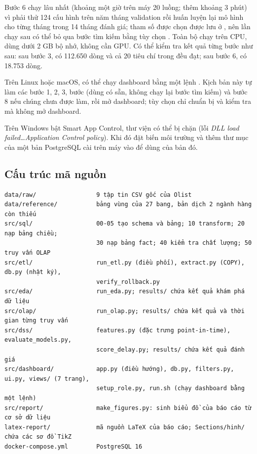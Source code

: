 Bước 6 chạy lâu nhất (khoảng một giờ trên máy 20 luồng;  thêm khoảng 3 phút) vì phải thử 124 cấu hình trên năm tháng validation rồi huấn luyện lại mô hình cho từng tháng trong 14 tháng đánh giá; tham số được chọn được lưu ở , nên lần chạy sau có thể bỏ qua bước tìm kiếm bằng tùy chọn . Toàn bộ chạy trên CPU, dùng dưới 2 GB bộ nhớ, không cần GPU. Có thể kiểm tra kết quả từng bước như sau: sau bước 3,  có 112.650 dòng và cả 20 tiêu chí trong  đều đạt; sau bước 6,  có 18.753 dòng.

Trên Linux hoặc macOS, có thể chạy dashboard bằng một lệnh . Kịch bản này tự làm các bước 1, 2, 3, bước  (dùng  có sẵn, không chạy lại bước tìm kiếm) và bước 8 nếu chúng chưa được làm, rồi mở dashboard; tùy chọn  chỉ chuẩn bị và kiểm tra mà không mở dashboard.

Trên Windows bật Smart App Control, thư viện  có thể bị chặn (lỗi \textit{DLL load failed\ldots Application Control policy}). Khi đó đặt biến môi trường  và thêm thư mục  của một bản PostgreSQL cài trên máy vào  để dùng  của bản đó.

\subsection{Cấu trúc mã nguồn}

\begin{lstlisting}[style=SQLStyle, language={}]
data/raw/                 9 tập tin CSV gốc của Olist
data/reference/           bảng vùng của 27 bang, bản dịch 2 ngành hàng còn thiếu
src/sql/                  00-05 tạo schema và bảng; 10 transform; 20 nạp bảng chiều;
                          30 nạp bảng fact; 40 kiểm tra chất lượng; 50 truy vấn OLAP
src/etl/                  run_etl.py (điều phối), extract.py (COPY), db.py (nhật ký),
                          verify_rollback.py
src/eda/                  run_eda.py; results/ chứa kết quả khám phá dữ liệu
src/olap/                 run_olap.py; results/ chứa kết quả và thời gian từng truy vấn
src/dss/                  features.py (đặc trưng point-in-time), evaluate_models.py,
                          score_delay.py; results/ chứa kết quả đánh giá
src/dashboard/            app.py (điều hướng), db.py, filters.py, ui.py, views/ (7 trang),
                          setup_role.py, run.sh (chạy dashboard bằng một lệnh)
src/report/               make_figures.py: sinh biểu đồ của báo cáo từ cơ sở dữ liệu
latex-report/             mã nguồn LaTeX của báo cáo; Sections/hinh/ chứa các sơ đồ TikZ
docker-compose.yml        PostgreSQL 16
\end{lstlisting}

